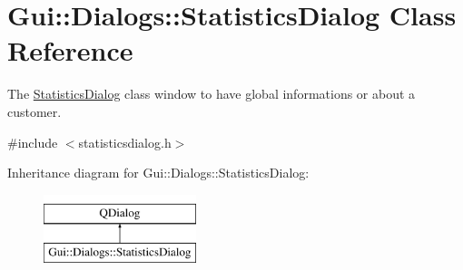 \hypertarget{classGui_1_1Dialogs_1_1StatisticsDialog}{\section{Gui\-:\-:Dialogs\-:\-:Statistics\-Dialog Class Reference}
\label{classGui_1_1Dialogs_1_1StatisticsDialog}
}


The \hyperlink{classGui_1_1Dialogs_1_1StatisticsDialog}{Statistics\-Dialog} class window to have global informations or about a customer.  




{\ttfamily \#include $<$statisticsdialog.\-h$>$}

Inheritance diagram for Gui\-:\-:Dialogs\-:\-:Statistics\-Dialog\-:\begin{figure}[H]
\begin{center}
\leavevmode
\includegraphics[height=2.000000cm]{d1/ddc/classGui_1_1Dialogs_1_1StatisticsDialog}
\end{center}
\end{figure}
